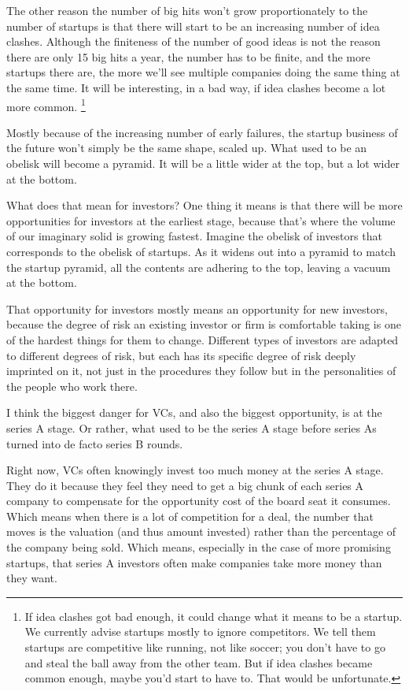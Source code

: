 The other reason the number of big hits won't grow proportionately to
the number of startups is that there will start to be an increasing
number of idea clashes. Although the finiteness of the number of good
ideas is not the reason there are only 15 big hits a year, the number
has to be finite, and the more startups there are, the more we'll see
multiple companies doing the same thing at the same time. It will be
interesting, in a bad way, if idea clashes become a lot more common.
\footnote{If idea clashes got bad enough, it could change what it means to
be a startup. We currently advise startups mostly to ignore competitors.
We tell them startups are competitive like running, not like soccer; you
don't have to go and steal the ball away from the other team. But if
idea clashes became common enough, maybe you'd start to have to. That
would be unfortunate.}

Mostly because of the increasing number of early failures, the startup
business of the future won't simply be the same shape, scaled up. What
used to be an obelisk will become a pyramid. It will be a little wider
at the top, but a lot wider at the bottom.

What does that mean for investors? One thing it means is that there will
be more opportunities for investors at the earliest stage, because
that's where the volume of our imaginary solid is growing fastest.
Imagine the obelisk of investors that corresponds to the obelisk of
startups. As it widens out into a pyramid to match the startup pyramid,
all the contents are adhering to the top, leaving a vacuum at the
bottom.

That opportunity for investors mostly means an opportunity for new
investors, because the degree of risk an existing investor or firm is
comfortable taking is one of the hardest things for them to change.
Different types of investors are adapted to different degrees of risk,
but each has its specific degree of risk deeply imprinted on it, not
just in the procedures they follow but in the personalities of the
people who work there.

I think the biggest danger for VCs, and also the biggest opportunity, is
at the series A stage. Or rather, what used to be the series A stage
before series As turned into de facto series B rounds.

Right now, VCs often knowingly invest too much money at the series A
stage. They do it because they feel they need to get a big chunk of each
series A company to compensate for the opportunity cost of the board
seat it consumes. Which means when there is a lot of competition for a
deal, the number that moves is the valuation (and thus amount invested)
rather than the percentage of the company being sold. Which means,
especially in the case of more promising startups, that series A
investors often make companies take more money than they want.

